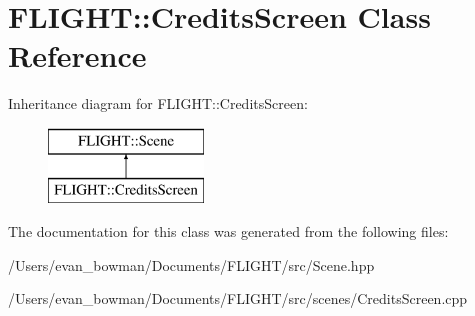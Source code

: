 \hypertarget{class_f_l_i_g_h_t_1_1_credits_screen}{}\section{F\+L\+I\+G\+HT\+:\+:Credits\+Screen Class Reference}
\label{class_f_l_i_g_h_t_1_1_credits_screen}
Inheritance diagram for F\+L\+I\+G\+HT\+:\+:Credits\+Screen\+:\begin{figure}[H]
\begin{center}
\leavevmode
\includegraphics[height=2.000000cm]{class_f_l_i_g_h_t_1_1_credits_screen}
\end{center}
\end{figure}


The documentation for this class was generated from the following files\+:\begin{DoxyCompactItemize}
\item 
/\+Users/evan\+\_\+bowman/\+Documents/\+F\+L\+I\+G\+H\+T/src/Scene.\+hpp\item 
/\+Users/evan\+\_\+bowman/\+Documents/\+F\+L\+I\+G\+H\+T/src/scenes/Credits\+Screen.\+cpp\end{DoxyCompactItemize}
